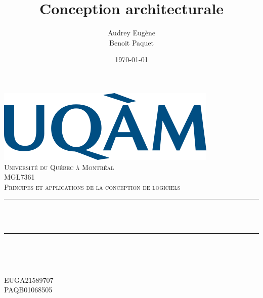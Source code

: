 \documentclass[12pt]{article}
\title{Conception architecturale}								%
\author{Audrey Eugène \\ Benoit Paquet}								%
\date{\today}											%
\makeatletter
\let\thetitle\@title
\let\theauthor\@author
\let\thedate\@date
\makeatother
\begin{document}

\begin{titlepage}
	\centering
    \vspace*{0.5 cm}
    \includegraphics[scale = 0.75]{Logo_UQAM.png}\\[1.0 cm]	%
    \textsc{\LARGE Université du Québec à Montréal}\\[2.0 cm]	%
	\textsc{\Large MGL7361}\\[0.5 cm]				%
	\textsc{\large Principes et applications de la conception de logiciels}\\[0.5 cm]				%
	\rule{\linewidth}{0.2 mm} \\[0.4 cm]
	{ \huge \bfseries \thetitle}\\
	\rule{\linewidth}{0.2 mm} \\[1.5 cm]
	
	\begin{minipage}{0.4\textwidth}
		\begin{flushleft} \large
			\theauthor
			\end{flushleft}
			\end{minipage}~
			\begin{minipage}{0.4\textwidth}
			\begin{flushright} \large
			EUGA21589707 \\
			PAQB01068505 \\
		\end{flushright}
	\end{minipage}\\[2 cm]
	
	{\large \thedate}\\[2 cm]
 
	\vfill
	
\end{titlepage}


\tableofcontents
\pagebreak

\end{document}

